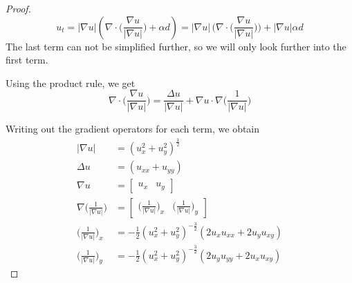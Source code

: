 \begin{proof}
\begin{equation}
    u_t = |\nabla u| (\nabla \cdot \bigg(\frac{\nabla u}{|\nabla u|}\bigg) + \alpha d) = |\nabla u|\,\bigg( \nabla \cdot \bigg(\frac{\nabla u}{|\nabla u|}\bigg) \bigg) + |\nabla u| \alpha d \label{eq:proof-writeout}
\end{equation}
The last term can not be simplified further, so we will only look further into the first term.

Using the product rule, we get
\begin{equation*}
    \nabla \cdot \bigg(\frac{\nabla u}{|\nabla u|}\bigg) = \frac{\Delta u}{|\nabla u|} + \nabla u \cdot \nabla\bigg( \frac{1}{|\nabla u|}\bigg)
\end{equation*}

Writing out the gradient operators for each term, we obtain
\begin{align}
    |\nabla u| &= (u_x^2+u_y^2)^{\frac{1}{2}} \label{eqs:grads-1}\\
    \Delta u &= (u_{xx} + u_{yy}) \label{eqs:grads-2}\\
    \nabla u &= \begin{bmatrix}u_x & u_y \end{bmatrix} \label{eqs:grads-3}\\
    \nabla \bigg( \frac{1}{|\nabla u|} \bigg) &= \begin{bmatrix}\bigg( \frac{1}{|\nabla u|} \bigg)_x & \bigg( \frac{1}{|\nabla u|} \bigg)_y \end{bmatrix} \label{eqs:grads-4}\\
    \bigg( \frac{1}{|\nabla u|} \bigg)_x &= -\frac{1}{2} (u_x^2+u_y^2)^{-\frac{3}{2}}(2u_x u_{xx}+2u_y u_{xy}) \label{eqs:grads-5}\\
    \bigg( \frac{1}{|\nabla u|} \bigg)_y &= -\frac{1}{2} (u_x^2+u_y^2)^{-\frac{3}{2}}(2u_y u_{yy}+2u_x u_{xy}) \label{eqs:grads-6}
\end{align}


\end{proof}

